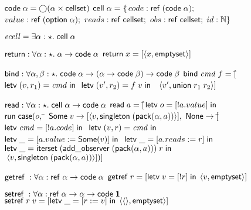 \begin{figure}
\mbox{}
\begin{specification}
\nextline $\mathsf{code}\;{\alpha} = \bigcirc{(\alpha \times \mathsf{cellset})}$ \nextline[1em]
$\mathsf{cell}\;{\alpha} = \{$\=$code: \mathsf{ref}\;(\mathsf{code}\;{\alpha});$ \nextline
                   \>$value: \mathsf{ref}\;(\mathsf{option}{\;\alpha});$ \nextline
                   \>$reads: \mathsf{ref}\;\mathsf{cellset};$ \nextline
                   \>$obs:   \mathsf{ref}\;\mathsf{cellset};$ \nextline
                   \>$id:    \mathbb{N}\}$ \nextline[1em]

$\mathit{ecell} = \exists \alpha:\star.\; \mathsf{cell}\;{\alpha}$ \nextline[1em]

$\mathsf{return} : \forall \alpha:\star.\; \alpha \to \mathsf{code}\;{\alpha}$ \nextline
$\mathsf{return}\;x = [\left<{x},{\mathsf{emptyset}}\right>]$ \nextline[1em]

$\mathsf{bind} : \forall \alpha,\beta:\star.\; \mathsf{code}\;{\alpha} \to (\alpha \to \mathsf{code}\;{\beta}) \to \mathsf{code}\;{\beta}$ \nextline
$\mathsf{bind}\;\mathit{cmd}\;f = [$\=$\mathsf{letv}\;(v,r_1) = \mathit{cmd}\;\mathsf{in}\;$ \nextline
                        \>$\mathsf{letv}\;(v',r_2) = f\;v\;\mathsf{in}\;$ \nextline
                        \>$\;\left<{v'},{\mathsf{union}\;r_1\;r_2}\right>]$\nextline[1em]

$\mathsf{read} : \forall \alpha:\star.\; \mathsf{cell}\;{\alpha} \to \mathsf{code}\;{\alpha}$ \nextline
$\mathsf{read}\;a = [$\=$\mathsf{letv}\;o = [!a.value]\;\mathsf{in}\;$ \nextline
                     \>$\mathsf{run}\;\mathsf{case}(o,$ \nextline
                     \>\qquad\= $\mathsf{Some}\;v \to [\left<{v},{\mathsf{singleton}\;(\mathsf{pack}({\alpha}, {a}))}\right>],$ \nextline
                     \>      \> $\mathsf{None} \to [$\=$\mathsf{letv}\;\mathit{cmd} = [!a.code]\;\mathsf{in}\;$ \nextline
                     \>      \>                     \>$\mathsf{letv}\;(v,r) = \mathit{cmd}\;\mathsf{in}\;$ \nextline
                     \>      \>                     \>$\mathsf{letv}\;\_ = [a.value := \mathsf{Some}(v)]\;\mathsf{in}\;$\nextline
                     \>      \>                     \>$\mathsf{letv}\;\_ = [a.reads := r]\;\mathsf{in}\;$ \nextline
                     \>      \>                     \>$\mathsf{letv}\;\_ = \mathsf{iterset}\;(\mathsf{add\_observer}\;(\mathsf{pack}({\alpha}, {a})))\;r\;\mathsf{in}\;$ \nextline
                     \>      \>                     \>$\;\left<{v},{\mathsf{singleton}\;(\mathsf{pack}({\alpha}, {a}))}\right>])]$ \nextline[1em]

$\mathsf{getref}\; : \forall \alpha : \mathsf{ref}\;\alpha \to \mathsf{code}\;{\alpha}$ \nextline
$\mathsf{getref}\; r = [\mathsf{letv}\;v = [!r]\;\mathsf{in}\;\left<{v},{\mathsf{emptyset}}\right>]$ \nextline[1em]

$\mathsf{setref}\; : \forall \alpha : \mathsf{ref}\;\alpha \to \alpha \to \mathsf{code}\;{\mathbf{1}}$ \nextline
$\mathsf{setref}\; r\;v = [\mathsf{letv}\;\_ = [r := v]\;\mathsf{in}\;\left<{\left<\right>},{\mathsf{emptyset}}\right>]$ \nextline[1em]


\end{specification}
\end{figure}
